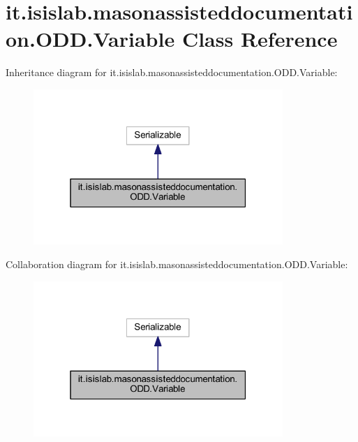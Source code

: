 \hypertarget{classit_1_1isislab_1_1masonassisteddocumentation_1_1_o_d_d_1_1_variable}{\section{it.\-isislab.\-masonassisteddocumentation.\-O\-D\-D.\-Variable Class Reference}
\label{classit_1_1isislab_1_1masonassisteddocumentation_1_1_o_d_d_1_1_variable}
}


Inheritance diagram for it.\-isislab.\-masonassisteddocumentation.\-O\-D\-D.\-Variable\-:\nopagebreak
\begin{figure}[H]
\begin{center}
\leavevmode
\includegraphics[width=268pt]{classit_1_1isislab_1_1masonassisteddocumentation_1_1_o_d_d_1_1_variable__inherit__graph}
\end{center}
\end{figure}


Collaboration diagram for it.\-isislab.\-masonassisteddocumentation.\-O\-D\-D.\-Variable\-:\nopagebreak
\begin{figure}[H]
\begin{center}
\leavevmode
\includegraphics[width=268pt]{classit_1_1isislab_1_1masonassisteddocumentation_1_1_o_d_d_1_1_variable__coll__graph}
\end{center}
\end{figure}
